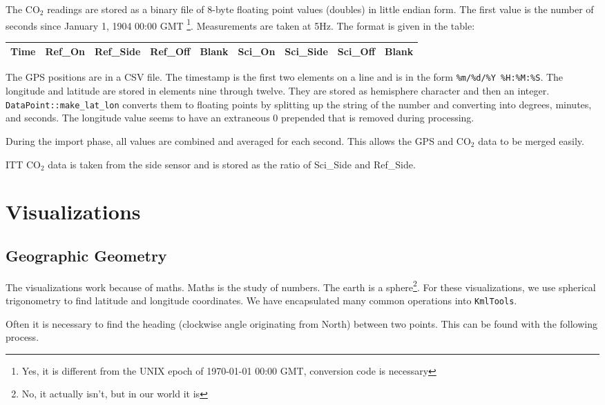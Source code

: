 \documentclass[12pt]{article}
\begin{document}
The CO$_2$ readings are stored as a binary file of 8-byte floating point values (doubles) in little endian form.  The first value is the number of seconds since January 1, 1904 00:00 GMT \footnote{Yes, it is different from the UNIX epoch of 1970-01-01 00:00 GMT, conversion code is necessary}. Measurements are taken at 5Hz. The format is given in the table:

\begin{center}
\begin{tabular}{|l|l|l|l|l|l|l|l|l|}
\hline 
Time & Ref\_On & Ref\_Side & Ref\_Off & Blank & Sci\_On & Sci\_Side & Sci\_Off & Blank \\
\hline
\end{tabular}
\end{center}

The GPS positions are in a CSV file.  The timestamp is the first two elements on a line and is in the form \texttt{\%m/\%d/\%Y \%H:\%M:\%S}.  The longitude and latitude are stored in elements nine through twelve.  They are stored as hemisphere character and then an integer.  \texttt{DataPoint::make\_lat\_lon} converts them to floating points by splitting up the string of the number and converting into degrees, minutes, and seconds. The longitude value seems to have an extraneous 0 prepended that is removed during processing.

During the import phase, all values are combined and averaged for each second.  This allows the GPS and CO$_2$ data to be merged easily.

ITT CO$_2$ data is taken from the side sensor and is stored as the ratio of Sci\_Side and Ref\_Side.  

\section*{Visualizations}

\subsection*{Geographic Geometry}

The visualizations work because of maths.  Maths is the study of numbers.  The earth is a sphere\footnote{No, it actually isn't, but in our world it is}.  For these visualizations, we use spherical trigonometry to find latitude and longitude coordinates.  We have encapsulated many common operations into \texttt{KmlTools}.

Often it is necessary to find the heading (clockwise angle originating from North) between two points.  This can be found with the following process.
\end{document}
